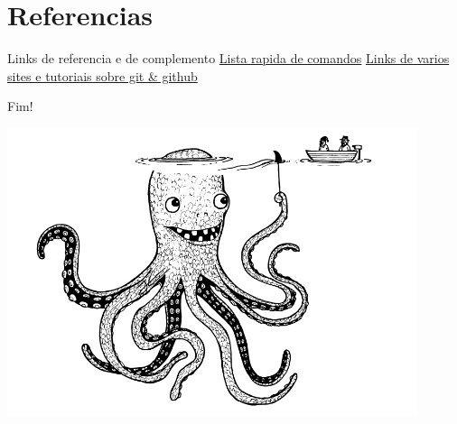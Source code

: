 \section{Referencias}

\begin{slide}[method=direct]{Links de referencia e de complemento}
	\href{https://training.github.com/kit/downloads/github-git-cheat-sheet.pdf}{Lista rapida de comandos}
	\href{https://help.github.com/articles/good-resources-for-learning-git-and-github/}{Links de varios sites e tutoriais sobre git \& github}
\end{slide}

\begin{slide}[method=direct]{Fim!}
\begin{center}
\includegraphics[width=0.9\textwidth,natwidth=842,natheight=595]{./imagens/octupus.jpg}
\end{center}
\end{slide}
